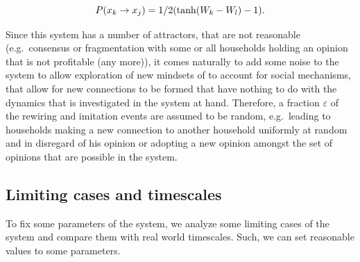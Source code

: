 \begin{equation}
	P(x_k \rightarrow x_j) = 1/2 ({\rm tanh}(W_k - W_l)-1).
	\label{primitive_imitation_probability}
\end{equation}

Since this system has a number of attractors, that are not reasonable (e.g.\ consensus or fragmentation with some or all households holding an opinion that is not profitable (any more)), it comes naturally to add some noise to the system to allow exploration of new mindsets of to account for social mechanisms, that allow for new connections to be formed that have nothing to do with the dynamics that is investigated in the system at hand.
Therefore, a fraction $\varepsilon$ of the rewiring and imitation events are assumed to be random, e.g.\ leading to households making a new connection to another household uniformly at random and in disregard of his opinion or adopting a new opinion amongst the set of opinions that are possible in the system.

\subsection{Limiting cases and timescales}
To fix some parameters of the system, we analyze some limiting cases of the system and compare them with real world timescales. Such, we can set reasonable values to some parameters.
